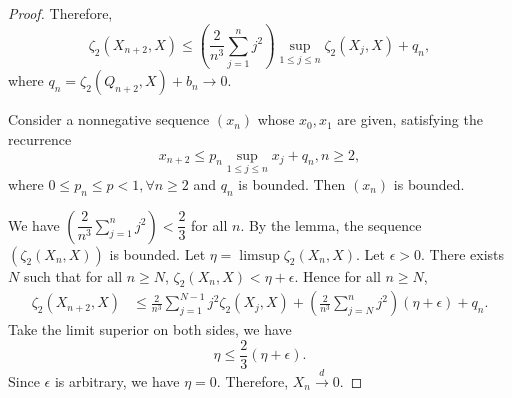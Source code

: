 \begin{proof}
  Therefore,
  $$\zeta_2(X_{n+2}, X) \le \left(\frac{2}{n^3} \sum_{j=1}^{n} j^2\right) \sup\limits_{1 \le j \le n} \zeta_2(X_j, X) + q_n,$$
  where $q_n = \zeta_2(Q_{n+2}, X) + b_n \to 0$.

  \begin{lemma}
    Consider a nonnegative sequence $(x_n)$ whose $x_0, x_1$ are given, satisfying the recurrence
    \begin{equation}
      x_{n+2} \le p_n\sup\limits_{1 \le j \le n} x_j + q_n, n \ge 2,
    \end{equation}
    where $0\le p_n \le p < 1, \forall n \ge 2$ and $q_n$ is bounded. Then $(x_n)$ is bounded.
  \end{lemma}


  We have $\left(\dfrac{2}{n^3} \sum_{j=1}^{n} j^2\right) < \dfrac{2}{3}$ for all $n$. By the lemma, the sequence $(\zeta_2(X_n, X))$ is bounded. Let $\eta = \limsup\zeta_2(X_n, X)$. Let $\epsilon > 0$. There exists $N$ such that for all $n \ge N$, $\zeta_2(X_n, X) < \eta + \epsilon$. Hence for all $n \ge N$,
  \begin{align*}
    \zeta_2(X_{n+2}, X) & \le \frac{2}{n^3} \sum_{j=1}^{N-1} j^2 \zeta_2(X_j, X) + \left(\frac{2}{n^3} \sum_{j=N}^{n} j^2\right) (\eta + \epsilon) + q_n.
  \end{align*}
  Take the limit superior on both sides, we have
  $$\eta \le \frac{2}{3}(\eta + \epsilon).$$ Since $\epsilon$ is arbitrary, we have $\eta = 0$. Therefore, $X_n \xrightarrow{d} 0$.
\end{proof}